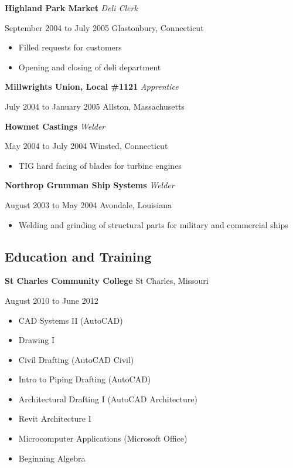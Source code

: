 \documentclass[9pt]{extarticle}
\begin{document}
\textbf{Highland Park Market} \hfill \textit{Deli Clerk}

September 2004 to July 2005 \hfill Glastonbury, Connecticut

\begin{multicols}{2}
\begin{itemize}
    \item Filled requests for customers 
        \columnbreak
    \item Opening and closing of deli department
\end{itemize}
\end{multicols}

\textbf{Millwrights Union, Local \#1121} \hfill \textit{Apprentice} 

July 2004 to January 2005 \hfill Allston, Massachusetts

\hfill

\textbf{Howmet Castings} \hfill \textit{Welder}

May 2004 to July 2004 \hfill Winsted, Connecticut

\begin{itemize}
    \item TIG hard facing of blades for turbine engines
\end{itemize}

\textbf{Northrop Grumman Ship Systems} \hfill \textit{Welder}

August 2003 to May 2004 \hfill Avondale, Louisiana

\begin{itemize}
    \item Welding and grinding of structural parts for military and commercial ships
\end{itemize}

\subsection*{Education and Training}
\textbf{St Charles Community College} \hfill St Charles, Missouri

August 2010 to June 2012
\begin{multicols}{2}
\begin{itemize}
    \item CAD Systems II (AutoCAD) 
    \item Drawing I 
    \item Civil Drafting (AutoCAD Civil)
    \item Intro to Piping Drafting (AutoCAD) 
        \columnbreak
    \item Architectural Drafting I (AutoCAD Architecture)
    \item Revit Architecture I 
    \item Microcomputer Applications (Microsoft Office)
    \item Beginning Algebra
\end{itemize}
\end{multicols}
\end{document}
